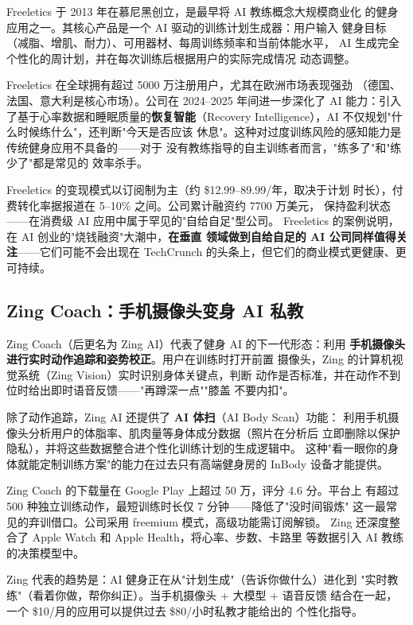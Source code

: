 Freeletics 于 2013 年在慕尼黑创立，是最早将 AI 教练概念大规模商业化
的健身应用之一。其核心产品是一个 AI 驱动的训练计划生成器：用户输入
健身目标（减脂、增肌、耐力）、可用器材、每周训练频率和当前体能水平，
AI 生成完全个性化的周计划，并在每次训练后根据用户的实际完成情况
动态调整。

Freeletics 在全球拥有超过 5000 万注册用户，尤其在欧洲市场表现强劲
（德国、法国、意大利是核心市场）。公司在 2024--2025 年间进一步深化了
AI 能力：引入了基于心率数据和睡眠质量的\textbf{恢复智能}（Recovery
Intelligence），AI 不仅规划"什么时候练什么"，还判断"今天是否应该
休息"。这种对过度训练风险的感知能力是传统健身应用不具备的——对于
没有教练指导的自主训练者而言，"练多了"和"练少了"都是常见的
效率杀手。

Freeletics 的变现模式以订阅制为主（约 \$12.99--89.99/年，取决于计划
时长），付费转化率据报道在 5--10\% 之间。公司累计融资约 7700 万美元，
保持盈利状态——在消费级 AI 应用中属于罕见的"自给自足"型公司。
Freeletics 的案例说明，在 AI 创业的"烧钱融资"大潮中，\textbf{在垂直
领域做到自给自足的 AI 公司同样值得关注}——它们可能不会出现在
TechCrunch 的头条上，但它们的商业模式更健康、更可持续。


\subsection{Zing Coach：手机摄像头变身 AI 私教}
\label{subsec:zing-coach}

Zing Coach（后更名为 Zing AI）代表了健身 AI 的下一代形态：利用
\textbf{手机摄像头进行实时动作追踪和姿势校正}。用户在训练时打开前置
摄像头，Zing 的计算机视觉系统（Zing Vision）实时识别身体关键点，判断
动作是否标准，并在动作不到位时给出即时语音反馈——"再蹲深一点""膝盖
不要内扣"。

除了动作追踪，Zing AI 还提供了 \textbf{AI 体扫}（AI Body Scan）功能：
利用手机摄像头分析用户的体脂率、肌肉量等身体成分数据（照片在分析后
立即删除以保护隐私），并将这些数据整合进个性化训练计划的生成逻辑中。
这种"看一眼你的身体就能定制训练方案"的能力在过去只有高端健身房的
InBody 设备才能提供。

Zing Coach 的下载量在 Google Play 上超过 50 万，评分 4.6 分。平台上
有超过 500 种独立训练动作，最短训练时长仅 7 分钟——降低了"没时间锻炼"
这一最常见的弃训借口。公司采用 freemium 模式，高级功能需订阅解锁。
Zing 还深度整合了 Apple Watch 和 Apple Health，将心率、步数、卡路里
等数据引入 AI 教练的决策模型中。

Zing 代表的趋势是：AI 健身正在从"计划生成"（告诉你做什么）进化到
"实时教练"（看着你做，帮你纠正）。当手机摄像头 + 大模型 + 语音反馈
结合在一起，一个 \$10/月的应用可以提供过去 \$80/小时私教才能给出的
个性化指导。


